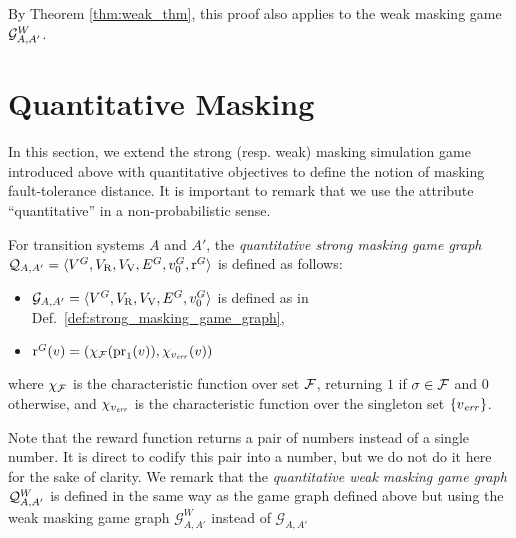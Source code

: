 By Theorem \ref{thm:weak_thm}, this proof also applies to the weak masking game $\mathcal{G}^W_{A,A'}$.

\section{Quantitative Masking} \label{sec:QuantMask}
In this section, we extend the strong (resp. weak) masking simulation game introduced above 
with quantitative objectives to define the notion of masking fault-tolerance distance.
It is important to remark that we use the attribute ``quantitative'' in a non-probabilistic sense.
\begin{defi}  
  For transition systems $A$ and $A'$, the \emph{quantitative strong masking game graph} 
  $\mathcal{Q}_{A, A'} = \langle V^G, V_{\mathrm{R}}, V_{\mathrm{V}}, E^G,  v_0^G,  \operatorname{r}^G \rangle$ is defined as follows:
 
\begin{itemize}
\item
  $\mathcal{G}_{A, A'}=\langle V^G, V_{\mathrm{R}}, V_{\mathrm{V}}, E^G, v_0^G \rangle$ is defined as in Def.~\ref{def:strong_masking_game_graph},
\item
  $ \operatorname{r}^G(v) = (\chi_{\mathcal{F}}(\operatorname{pr}_{1}(v)), \chi_{v_{\mathit{err}}}(v))$

\end{itemize}
%
where $\chi_{\mathcal{F}}$ is the characteristic function over 
set $\mathcal{F}$, returning $1$ if $\sigma \in \mathcal{F}$ and $0$ otherwise, and $\chi_{v_{\mathit{err}}}$ is the characteristic function over the singleton set $\{v_{\mathit{err}}\}$.
\end{defi}
Note that the reward function returns a pair of numbers instead of a
single number. It is direct to codify this pair into a number, but we
do not do it here for the sake of clarity.  We remark that the
\emph{quantitative weak masking game graph} $\mathcal{Q}^W_{A,A'}$
is defined in the same way as the game graph defined above but using
the weak masking game graph $\mathcal{G}^W_{A, A'}$ instead of
$\mathcal{G}_{A, A'}$


